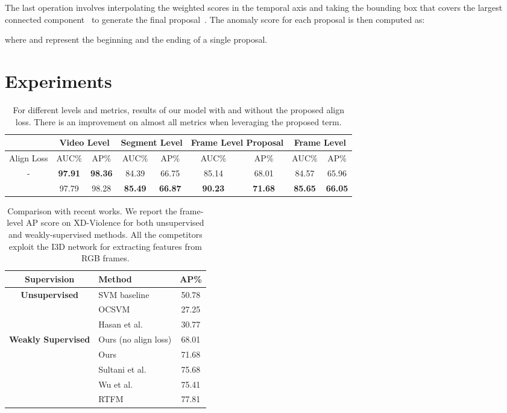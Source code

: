 \documentclass[runningheads]{llncs}
\newcommand{\cmark}{\ding{51}}\newcommand{\xmark}{\ding{55}}\renewcommand{\arraystretch}{1.2}
\begin{document}
The last operation involves interpolating the weighted scores in the temporal axis and taking the bounding box that covers the largest connected component~\cite{nguyen2018weakly} to generate the final proposal~\cite{zhou2016learning}. The anomaly score for each proposal is then computed as:

where  and  represent the beginning and the ending of a single proposal. \section{Experiments}
\begin{table}[t]
    \centering
    \begin{tabular}{c|c|c|c|c|c|c|c|c}
                    & \multicolumn{2}{c|}{Video Level} & \multicolumn{2}{c|}{Segment Level} & \multicolumn{2}{c|}{Frame Level Proposal} & \multicolumn{2}{c}{Frame Level} \\ \hline
    Align Loss  &  AUC\%    & AP\%  & AUC\% & AP\%  & AUC\% & AP\%  & AUC\% & AP\%  \\
-       & \textbf{97.91} & \textbf{98.36} & 84.39 & 66.75 & 85.14 & 68.01 & 84.57 & 65.96 \\ \cmark      & 97.79     & 98.28 & \textbf{85.49} &\textbf{ 66.87} & \textbf{90.23} & \textbf{71.68} & \textbf{85.65} & \textbf{66.05} \\
    \end{tabular}
    \caption{For different levels and metrics, results of our model with and without the proposed align loss. There is an improvement on almost all metrics when leveraging the proposed term.}
    \label{tab:align-ablation}
\end{table}
\begin{table}[t]
    \centering
    \begin{tabular}{c|l|c}
    Supervision & Method & AP\%    \\ \hline
    \multirow{3}{*}{\textbf{Unsupervised}} & SVM baseline  & 50.78   \\
        & OCSVM~\cite{scholkopf1999support}     & 27.25 \\
        & Hasan et al.~\cite{hasan2016learning} & 30.77 \\ \hline
    \multirow{5}{*}{\textbf{Weakly Supervised}} 
        & Ours (no align loss)                  & 68.01 \\
        & Ours                                  & 71.68 \\\cline{2-3}
        & Sultani et al.~\cite{sultani2018real} & 75.68  \\
        & Wu et al.~\cite{wu2020not}            & 75.41 \\
        & RTFM~\cite{tian2021weakly}            & 77.81 \\
    \end{tabular}
    \caption{Comparison with recent works. We report the frame-level AP score on XD-Violence for both unsupervised and weakly-supervised methods. All the competitors exploit the I3D network for extracting features from RGB frames.}
    \label{tab:competitors}
\end{table}
\end{document}
